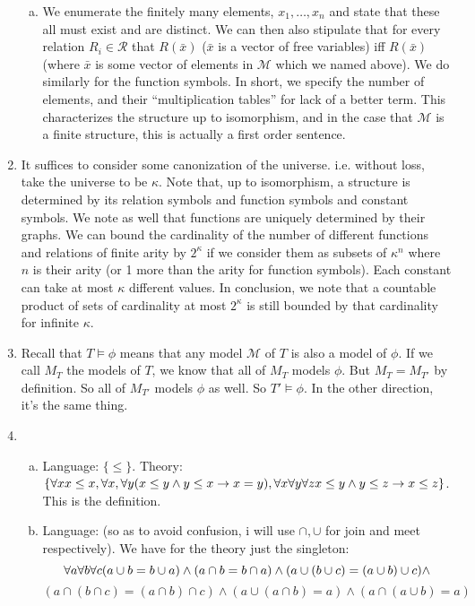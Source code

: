 \begin{enumerate}
\begin{enumerate}[a)]
	\item We enumerate the finitely many elements, $x_1, \ldots, x_n$ and state that these all must exist and are distinct. We can then also stipulate that for every relation $R_i \in \mathcal{R}$ that $R(\bar{x})$ ($\bar{x}$ is a vector of free variables) iff $R(\bar{x})$ (where $\bar{x}$ is some vector of elements in $\mathcal{M}$ which we named above). We do similarly for the function symbols. In short, we specify the number of elements, and their ``multiplication tables'' for lack of a better term. This characterizes the structure up to isomorphism, and in the case that $\mathcal{M}$ is a finite structure, this is actually a first order sentence. 
	
	\end{enumerate}

\item It suffices to consider some canonization of the universe. i.e. without loss, take the universe to be $\kappa$. Note that, up to isomorphism, a structure is determined by its relation symbols and function symbols and constant symbols. We note as well that functions are uniquely determined by their graphs. We can bound the cardinality of the number of different functions and relations of finite arity by $2^\kappa$ if we consider them as subsets of $\kappa^n$ where $n$ is their arity (or 1 more than the arity for function symbols). Each constant can take at most $\kappa$ different values. In conclusion, we note that a countable product of sets of cardinality at most $2^\kappa$ is still bounded by that cardinality for infinite $\kappa$. 

\item Recall that $T \models \phi$ means that any model $\mathcal{M}$ of $T$ is also a model of $\phi$. If we call $M_T$ the models of $T$, we know that all of $M_T$ models $\phi$. But $M_T = M_{T'}$ by definition. So all of $M_{T'}$ models $\phi$ as well. So $T' \models \phi$. In the other direction, it's the same thing. 

\item 

	\begin{enumerate}[a)]
	
	\item Language: $\{\leq\}$. Theory: $\{\forall x x \leq x, \forall x, \forall y ( x \leq y \land y \leq x \to x = y), \forall x\forall y\forall z x \leq y \land y \leq z \to x \leq z\}$. This is the definition. 
	
	\item Language: (so as to avoid confusion, i will use $\cap, \cup$ for join and meet respectively). We have for the theory just the singleton: \[\forall a \forall b \forall c (a \cup b = b \cup a) \land (a \cap b = b \cap a) \land (a \cup (b \cup c) = (a \cup b) \cup c) \land \]\[(a \cap (b \cap c) = (a \cap b) \cap c) \land (a \cup (a \cap b) = a) \land (a \cap (a \cup b) = a)\]
	

\end{enumerate}
\end{enumerate}
